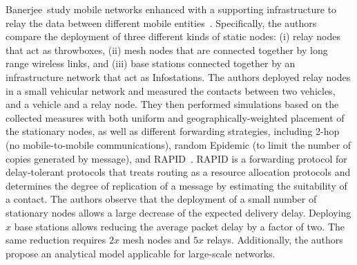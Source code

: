 Banerjee~\etal study mobile networks enhanced with a supporting infrastructure to relay the data between different mobile entities~\cite{banerjee2008relays}. Specifically, the authors compare the deployment of three different kinds of static nodes: (i) relay nodes that act as throwboxes, (ii) mesh nodes that are connected together by long range wireless links, and (iii) base stations connected together by an infrastructure network that act as Infostations. The authors deployed relay nodes in a small vehicular network and measured the contacts between two vehicles, and a vehicle and a relay node. They then performed simulations based on the collected measures with both uniform and geographically-weighted placement of the stationary nodes, as well as different forwarding strategies, including 2-hop (no mobile-to-mobile communications), random Epidemic (to limit the number of copies generated by message), and RAPID~\cite{balasubramanian2007dtn,balasubramanian2010replication}. RAPID is a forwarding protocol for delay-tolerant protocols that treats routing as a resource allocation protocols and determines the degree of replication of a message by estimating the suitability of a contact. The authors observe that the deployment of a small number of stationary nodes allows a large decrease of the expected delivery delay. Deploying $x$ base stations allows reducing the average packet delay by a factor of two. The same reduction requires $2x$ mesh nodes and $5x$ relays. Additionally, the authors propose an analytical model applicable for large-scale networks.

